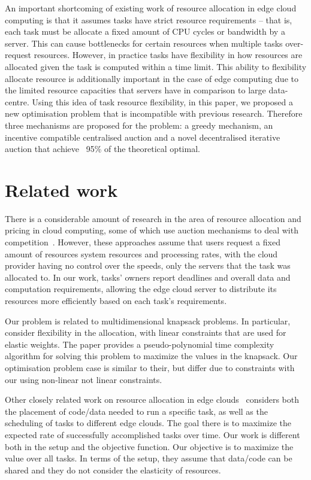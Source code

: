 An important shortcoming of existing work of resource allocation in edge cloud computing is that it assumes tasks have
strict resource requirements -- that is, each task must be allocate a fixed amount of CPU cycles or bandwidth by a
server. This can cause bottlenecks for certain resources when multiple tasks over-request resources. However, in
practice tasks have flexibility in how resources are allocated given the task is computed within a time limit. This
ability to flexibility allocate resource is additionally important in the case of edge computing due to the limited
resource capacities that servers have in comparison to large data-centre. Using this idea of task resource flexibility,
in this paper, we proposed a new optimisation problem that is incompatible with previous research. Therefore three
mechanisms are proposed for the problem: a greedy mechanism, an incentive compatible centralised auction and a novel
decentralised iterative auction that achieve ~95\% of the theoretical optimal.


\section{Related work}\label{sec:related-work}
There is a considerable amount of research in the area of resource allocation and pricing in cloud computing, some of
which use auction mechanisms to deal with competition~\cite{KUMAR2017234,Zhang2017,Du2019,Bi2019}. %
However, these approaches assume that users request a fixed amount of resources system resources and processing rates,
with the cloud provider having no control over the speeds, only the servers that the task was allocated to.  In our
work, tasks' owners report deadlines and overall data and computation requirements, allowing the edge cloud server to
distribute its resources more efficiently based on each task's requirements.

Our problem is related to multidimensional knapsack problems. In particular, \citet{Nip2017} consider flexibility in
the allocation, with linear constraints that are used for elastic weights. The paper provides a pseudo-polynomial time
complexity algorithm for solving this problem to maximize the values in the knapsack. Our optimisation problem case is
similar to their, but differ due to constraints with our using non-linear not linear constraints.

Other closely related work on resource allocation in edge clouds~\cite{vaji_infocom} considers both the placement of
code/data needed to run a specific task, as well as the scheduling of tasks to different edge clouds. The goal there is
to maximize the expected rate of successfully accomplished tasks over time. Our work is different both in the setup and
the objective function. Our objective is to maximize the value over all tasks. In terms of the setup, they assume that
data/code can be shared and they do not consider the elasticity of resources.

